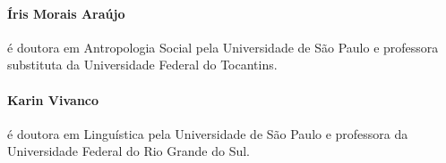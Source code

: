  \paragraph{Íris Morais Araújo} é doutora em Antropologia Social pela Universidade de São Paulo e professora substituta da Universidade Federal do Tocantins.%

 \paragraph{Karin Vivanco} é doutora em Linguística pela Universidade de São Paulo e professora da Universidade Federal do Rio Grande do Sul.


